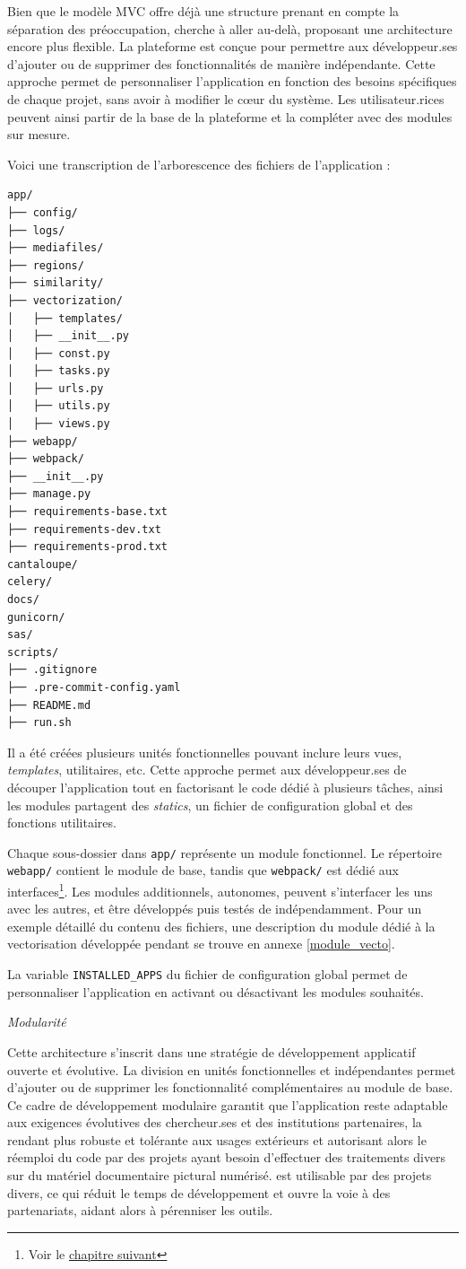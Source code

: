 Bien que le modèle MVC offre déjà une structure prenant en compte la
séparation des préoccupation, \eida cherche à aller au-delà, proposant
une architecture encore plus flexible. La plateforme est conçue pour
permettre aux développeur.ses d'ajouter ou de supprimer des fonctionnalités
de manière indépendante. Cette approche permet de personnaliser
l'application en fonction des besoins spécifiques de chaque projet, sans
avoir à modifier le cœur du système. Les utilisateur.rices peuvent ainsi
partir de la base de la plateforme et la compléter avec des modules sur
mesure.

Voici une transcription de l'arborescence des fichiers de l'application
:

\begin{verbatim}
app/
├── config/
├── logs/
├── mediafiles/
├── regions/
├── similarity/
├── vectorization/
│   ├── templates/
│   ├── __init__.py
│   ├── const.py
│   ├── tasks.py
│   ├── urls.py
│   ├── utils.py
│   ├── views.py
├── webapp/
├── webpack/
├── __init__.py
├── manage.py
├── requirements-base.txt
├── requirements-dev.txt
├── requirements-prod.txt
cantaloupe/
celery/
docs/
gunicorn/
sas/
scripts/
├── .gitignore
├── .pre-commit-config.yaml
├── README.md
├── run.sh
\end{verbatim}

Il a été créées plusieurs unités fonctionnelles pouvant inclure leurs vues, \textit{templates}, utilitaires, etc. Cette approche
permet aux développeur.ses de découper l'application tout en factorisant le code dédié à
plusieurs tâches, ainsi les modules partagent des \textit{statics}, un fichier
de configuration global et des fonctions utilitaires.

Chaque sous-dossier dans \texttt{app/} représente un module fonctionnel. Le
répertoire \texttt{webapp/} contient le module de base, tandis que \texttt{webpack/} est
dédié aux interfaces\footnote{Voir le \hyperlink{chapitre-8-interfaces}{chapitre suivant}}. Les modules
additionnels, autonomes, peuvent s'interfacer les uns avec les autres,
et être développés puis testés de indépendamment. Pour un exemple
détaillé du contenu des fichiers, une description du module dédié à
la vectorisation développée pendant se trouve en annexe \ref{module_vecto}. 

La variable \texttt{INSTALLED\_APPS} du fichier de configuration global permet de
personnaliser l'application en activant ou désactivant les modules
souhaités.

\emph{Modularité}

Cette architecture s'inscrit dans une stratégie de développement
applicatif ouverte et évolutive. La division en unités fonctionnelles et
indépendantes permet d'ajouter ou de supprimer les fonctionnalité
complémentaires au module de base. Ce cadre de développement modulaire
garantit que l'application reste adaptable aux exigences évolutives des
chercheur.ses et des institutions partenaires, la rendant plus robuste et
tolérante aux usages extérieurs et autorisant alors le réemploi du code
par des projets ayant besoin d'effectuer des traitements divers sur
du matériel documentaire pictural numérisé. \aikon est utilisable par des
projets divers, ce qui réduit le temps de développement et ouvre la voie
à des partenariats, aidant alors à pérenniser les outils.

